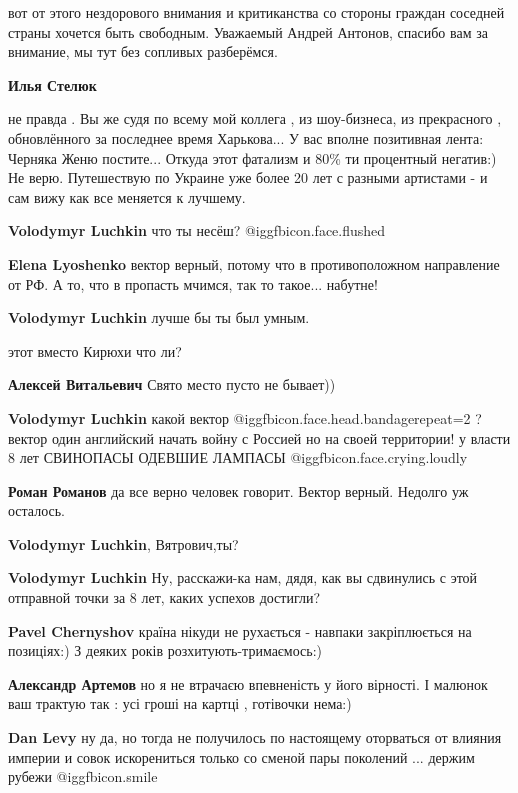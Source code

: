 \begin{itemize}
\begin{itemize}
вот от этого нездорового внимания и критиканства со стороны граждан соседней
страны хочется быть свободным. Уважаемый Андрей Антонов, спасибо вам за
внимание, мы тут без сопливых разберёмся.

\textbf{Илья Стелюк} 

не правда . Вы же судя по всему мой коллега , из шоу-бизнеса, из прекрасного ,
обновлённого за последнее время Харькова... У вас вполне позитивная лента:
Черняка Женю постите... Откуда этот фатализм и 80\% ти процентный негатив:) Не
верю. Путешествую по Украине уже более 20 лет с разными артистами - и сам вижу
как все меняется к лучшему.

\textbf{Volodymyr Luchkin} что ты несёш? @igg{fbicon.face.flushed} 

\textbf{Elena Lyoshenko} вектор верный, потому что в противоположном направление от РФ. А то, что в пропасть мчимся, так то такое... набутне!

\textbf{Volodymyr Luchkin} лучше бы ты был умным.

этот вместо Кирюхи что ли?

\textbf{Алексей Витальевич}
Свято место пусто не бывает))

\textbf{Volodymyr Luchkin} какой вектор  @igg{fbicon.face.head.bandage}{repeat=2} ?вектор один английский начать войну с Россией но на своей территории! у власти 8 лет СВИНОПАСЫ ОДЕВШИЕ ЛАМПАСЫ  @igg{fbicon.face.crying.loudly} 

\textbf{Роман Романов} да все верно человек говорит. Вектор верный. Недолго уж осталось.

\textbf{Volodymyr Luchkin}, Вятрович,ты?

\textbf{Volodymyr Luchkin} Ну, расскажи-ка нам, дядя, как вы сдвинулись с этой отправной точки за 8 лет, каких успехов достигли?

\textbf{Pavel Chernyshov} країна нікуди не рухається - навпаки закріплюється на позиціях:) З деяких років розхитують-тримаємось:)

\textbf{Александр Артемов} но я не втрачаєю впевненість у його вірності. І малюнок ваш трактую так : усі гроші на картці , готівочки нема:)

\textbf{Dan Levy} ну да, но тогда не получилось по настоящему оторваться от влияния империи и совок искорениться только со сменой пары поколений ... держим рубежи  @igg{fbicon.smile} 


\end{itemize}
\end{itemize}
